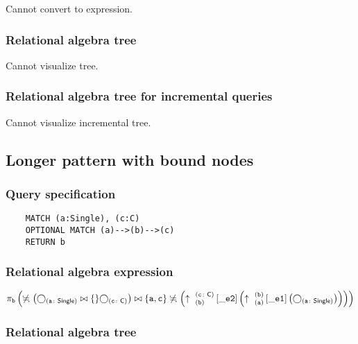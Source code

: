 	Cannot convert to expression.

	\subsubsection*{Relational algebra tree}

	Cannot visualize tree.

	\subsubsection*{Relational algebra tree for incremental queries}

	Cannot visualize incremental tree.
	\subsection{Longer pattern with bound nodes}

	\subsubsection*{Query specification}

	\begin{lstlisting}
	MATCH (a:Single), (c:C)
	OPTIONAL MATCH (a)-->(b)-->(c)
	RETURN b
	\end{lstlisting}


	\subsubsection*{Relational algebra expression}

	$\projection{\var{b}} \left(\alldifferent{} \left(\getvertices{a}{Single} \join \{\} \getvertices{c}{C}\right) \join \{\var{a}, \var{c}\} \alldifferent{} \left(\expandout{b}{c}{C}{\_e2}{} \left(\expandout{a}{b}{}{\_e1}{} \left(\getvertices{a}{Single}\right)\right)\right)\right)$

	\subsubsection*{Relational algebra tree}

